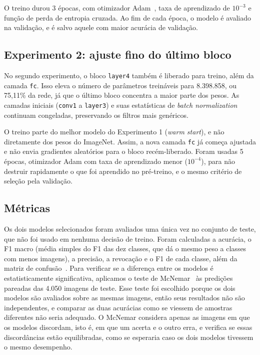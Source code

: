 \documentclass[conference,a4paper]{IEEEtran}
\begin{document}
O treino durou 3 épocas, com otimizador Adam~\cite{kingma2015adam}, taxa de aprendizado de $10^{-3}$ e função de perda de entropia cruzada. Ao fim de cada época, o modelo é avaliado na validação, e é salvo aquele com maior acurácia de validação.

\subsection{Experimento 2: ajuste fino do último bloco}

No segundo experimento, o bloco \texttt{layer4} também é liberado para treino, além da camada \texttt{fc}. Isso eleva o número de parâmetros treináveis para 8.398.858, ou 75,11\% da rede, já que o último bloco concentra a maior parte dos pesos. As camadas iniciais (\texttt{conv1} a \texttt{layer3}) e suas estatísticas de \textit{batch normalization} continuam congeladas, preservando os filtros mais genéricos.

O treino parte do melhor modelo do Experimento 1 (\textit{warm start}), e não diretamente dos pesos do ImageNet. Assim, a nova camada \texttt{fc} já começa ajustada e não envia gradientes aleatórios para o bloco recém-liberado. Foram usadas 5 épocas, otimizador Adam com taxa de aprendizado menor ($10^{-4}$), para não destruir rapidamente o que foi aprendido no pré-treino, e o mesmo critério de seleção pela validação.

\subsection{Métricas}

Os dois modelos selecionados foram avaliados uma única vez no conjunto de teste, que não foi usado em nenhuma decisão de treino. Foram calculadas a acurácia, o F1 macro (média simples do F1 das dez classes, que dá o mesmo peso a classes com menos imagens), a precisão, a revocação e o F1 de cada classe, além da matriz de confusão~\cite{sokolova2009systematic,pedregosa2011scikit}. Para verificar se a diferença entre os modelos é estatisticamente significativa, aplicamos o teste de McNemar~\cite{mcnemar1947note} às predições pareadas das 4.050 imagens de teste. Esse teste foi escolhido porque os dois modelos são avaliados sobre as mesmas imagens, então seus resultados não são independentes, e comparar as duas acurácias como se viessem de amostras diferentes não seria adequado. O McNemar considera apenas as imagens em que os modelos discordam, isto é, em que um acerta e o outro erra, e verifica se essas discordâncias estão equilibradas, como se esperaria caso os dois modelos tivessem o mesmo desempenho.
\end{document}
